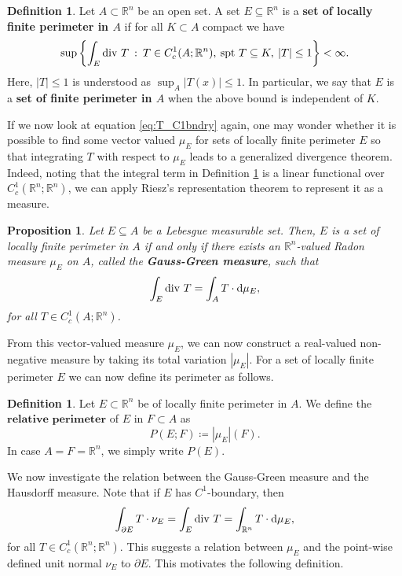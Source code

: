 \documentclass[artcle, 11pt, reqno]{amsart}
\numberwithin{equation}{section}
\newcommand{\R}{\mathbb{R}}
\theoremstyle{plain}
\newtheorem{proposition}[theorem]{Proposition}
\theoremstyle{definition}
\newtheorem{definition}[theorem]{Definition}
\theoremstyle{remark}
\begin{document}
	\begin{definition} \label{def:perimeter}
		Let $A\subset\R^n$ be an open set. A set $E \subseteq \R^n$ is a \textbf{set of locally finite perimeter in $A$} if for all $K \subset A$ compact we have 
		\begin{equation} \label{eq:LocFin}
			\sup\left\{ \int_E \textnormal{div } T \: : \: T \in C^1_c(A;\R^n), \: \textnormal{spt }T \subseteq K, \: |T| \leq 1 \right\} < \infty.
		\end{equation}
		Here, $|T| \leq 1$ is understood as $\sup_{A} |T(x)| \leq 1$.
		In particular, we say that $E$ is a \textbf{set of finite perimeter in $A$} when the above bound is independent of $K$.
	\end{definition}
	If we now look at equation \ref{eq:T_C1bndry} again, one may wonder whether it is possible to find some vector valued $\mu_E$ for sets of locally finite perimeter $E$ so that integrating $T$ with respect to $\mu_E$ leads to a generalized divergence theorem.
	Indeed, noting that the integral term in Definition \ref{def:perimeter} is a linear functional over $C^1_c(\R^n;\R^n)$, we can apply Riesz's representation theorem to represent it as a measure.
	
	\begin{proposition}
		Let $E \subseteq A$ be a Lebesgue measurable set. Then, $E$ is a set of locally finite perimeter in $A$ if and only if there exists an $\R^n$-valued Radon measure $\mu_E$ on $A$, called the \textnormal{\textbf{Gauss-Green measure}}, such that
		\begin{equation} \label{eq:GGmeasure}
			\int_E \textnormal{div }T = \int_{A} T \cdot \textnormal{d}\mu_E,
		\end{equation}
		for all $T \in C^1_c(A;\R^n)$.
	\end{proposition}
	From this vector-valued measure $\mu_E$, we can now construct a real-valued non-negative measure by taking its total variation $|\mu_E|$.
	For a set of locally finite perimeter $E$ we can now define its perimeter as follows.
	
	\begin{definition} \label{def:localperimeter}
		Let $E \subset \R^n$ be of locally finite perimeter in $A$. We define the $\textbf{relative perimeter}$ of $E$ in $F \subset A$ as 
		\[
		P(E;F) \coloneqq |\mu_E|(F).
		\]
		In case $A=F=\R^n$, we simply write $P(E)$.
	\end{definition} 
	We now investigate the relation between the Gauss-Green measure and the Hausdorff measure.
	Note that if $E$ has $C^1$-boundary, then
	\[
	\int_{\partial E} T \cdot \nu_E =
	\int_E \textnormal{div }T = \int_{\R^n} T \cdot \textnormal{d}\mu_E,
	\]
	for all $T \in C^1_c(\R^n;\R^n)$. This suggests a relation between $\mu_E$ and the point-wise defined unit normal $\nu_E$ to $\partial E$. This motivates the following definition.
	
\end{document}
